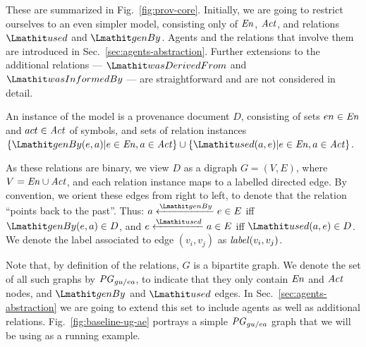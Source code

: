 These are summarized in Fig.~\ref{fig:prov-core}.
%
Initially, we are going to restrict ourselves to an even simpler model, consisting only of $\mathit{En}$, $\mathit{Act}$, and relations $\used$ and $\wgby$. Agents and the relations that involve them are introduced in Sec.~\ref{sec:agents-abstraction}.
%
Further extensions to the additional relations --- $\wdf$ and $\wasInfBy$ --- are straightforward and are not considered in detail.

%
An instance  of the model is a provenance document $D$, consisting of sets $en \in \mathit{En}$ and $act \in \mathit{Act}$ of symbols, and sets of relation instances $\{ \wgby(e,a)  | e \in \en, a \in \act \} \cup   \{ \used(a,e)  | e \in \en, a \in \act\}$. 

%
As these relations are binary, we view $D$ as a digraph $G=(V,E)$, where $V= \mathit{En} \cup \mathit{Act}$, and each relation instance maps to a labelled directed edge. By convention, we orient these edges from right to left, to denote that the relation ``points back to the past''. Thus:
$a \xleftarrow{\wgby} e \in E$ iff $\wgby(e,a) \in D$, and $e \xleftarrow{\used} a \in E$ iff $\used(a,e) \in D$.
%
We denote the label associated to edge $(v_i, v_j)$ as $\mathit{label}(v_i,v_j)$. 

%
Note that, by definition of the relations, $G$ is a bipartite graph.
We denote the set of all such graphs by $\mathit{PG}_{gu/ea}$, to indicate that they only contain $\mathit{En}$ and $\mathit{Act}$ nodes, and $\wgby$ and $\used$ edges. In Sec.~\ref{sec:agents-abstraction} we are going to extend this set to include agents as well as additional relations.
Fig.~\ref{fig:baseline-ug-ae} portrays a simple $\mathit{PG}_{gu/ea}$ graph that we will be using as a running example. 


